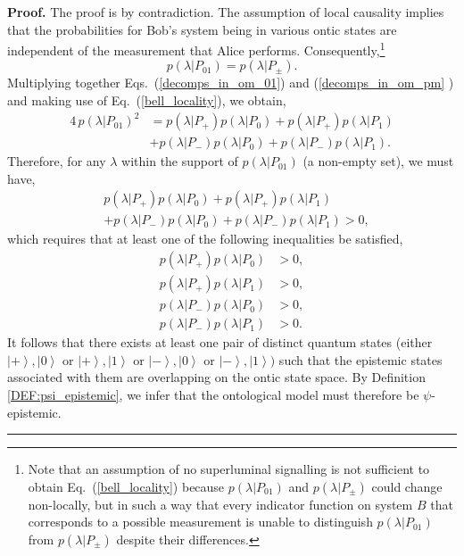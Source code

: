 \documentclass[aps,nofootinbib,12pt]{revtex4-2}
\newenvironment{proof}[1][Proof]{\noindent\textbf{#1.} }{\ \rule{0.5em}{0.5em}}
\begin{document}
\begin{proof}
The proof is by contradiction. The assumption of local causality
implies that the probabilities for Bob's system being in various
ontic states are independent of the measurement that Alice performs.
Consequently,\footnote{Note that an assumption of no superluminal
signalling is not sufficient to obtain Eq.~(\ref{bell_locality})
because $p(\lambda|P_{01})$ and $p(\lambda|P_{\pm})$ could change
non-locally, but in such a way that every indicator function on
system $B$ that corresponds to a possible measurement is unable to
distinguish $p(\lambda|P_{01})$ from $p(\lambda|P_{\pm})$ despite
their differences.}
\begin{equation}
p(\lambda|P_{01})=p(\lambda|P_{\pm}).\label{bell_locality}
\end{equation}
Multiplying together Eqs.~(\ref{decomps_in_om_01}) and (\ref{decomps_in_om_pm}%
) and making use of Eq.~(\ref{bell_locality}), we obtain,
\begin{align}
4\,p\left(\lambda|P_{01}\right)^{2} &= p\left(\lambda|P_{+}\right)
p\left(\lambda|P_{0}\right) + p\left(\lambda|P_{+}\right)
p\left(\lambda|P_{1}\right)
  \nonumber\\
& + p\left(\lambda|P_{-}\right)  p\left(\lambda|P_{0}\right)
+p\left(\lambda|P_{-}\right)  p\left(\lambda|P_{1}\right).
\end{align}
Therefore, for any $\lambda$ within the support of $p\left(  \lambda
|P_{01}\right)$ (a non-empty set), we must have,
\begin{align}
&  p\left(\lambda|P_{+}\right)  p\left(\lambda|P_{0}\right) +p\left(
\lambda|P_{+}\right)  p\left(\lambda|P_{1}\right)  \nonumber\\
&  +p\left(\lambda|P_{-}\right)  p\left(\lambda|P_{0}\right)
+p\left(\lambda|P_{-}\right)  p\left(\lambda|P_{1}\right)  >0,
\end{align}
which requires that at least one of the following inequalities be
satisfied,
\begin{align}
p\left(\lambda|P_{+}\right)  p\left(\lambda|P_{0}\right)   &
>0,\nonumber\\
p\left(\lambda|P_{+}\right)  p\left(\lambda|P_{1}\right)   &
>0,\nonumber\\
p\left(\lambda|P_{-}\right)  p\left(\lambda|P_{0}\right)   &
>0,\nonumber\\
p\left(\lambda|P_{-}\right)  p\left(\lambda|P_{1}\right)   &
>0.
\end{align}
It follows that there exists at least one pair of distinct quantum
states (either $\left\vert +\right\rangle ,\left\vert 0\right\rangle
$ or $\left\vert +\right\rangle ,\left\vert 1\right\rangle $ or
$\left\vert -\right\rangle ,\left\vert 0\right\rangle $ or
$\left\vert -\right\rangle ,\left\vert 1\right\rangle )$ such that
the epistemic states associated with them are overlapping on the
ontic state space. By Definition \ref{DEF:psi_epistemic}, we infer
that the ontological model must therefore be $\psi$-epistemic.
\end{proof}
\end{document}
